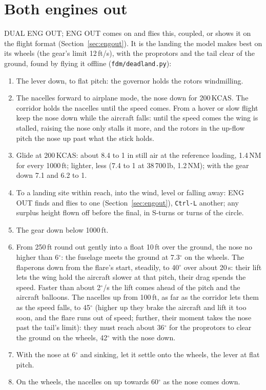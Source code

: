 \documentclass[11pt,a4paper,oneside]{book}
\newcommand{\key}[1]{\texttt{#1}}
\newcommand{\ann}[1]{\textsf{#1}}
\begin{document}
\section{Both engines out}\label{sec:dualeng}
\ann{DUAL ENG OUT}; ENG OUT comes on and flies this, coupled, or shows it on the flight format
(Section~\ref{sec:engout}). It is the landing the model makes best on its wheels (the gear's limit 12\,ft/s), with the
proprotors and the tail clear of the ground, found by flying it offline (\texttt{fdm/deadland.py}):
\begin{enumerate}
\item The lever down, to flat pitch: the governor holds the rotors windmilling.
\item The nacelles forward to airplane mode, the nose down for 200\,KCAS. The corridor holds the nacelles until the
speed comes. From a hover or slow flight keep the nose down while the aircraft falls: until the speed comes the wing
is stalled, raising the nose only stalls it more, and the rotors in the up-flow pitch the nose up past what the stick
holds.
\item Glide at 200\,KCAS: about 8.4 to 1 in still air at the reference loading, 1.4\,NM for every 1000\,ft; lighter,
less (7.4 to 1 at 38\,700\,lb, 1.2\,NM); with the gear down 7.1 and 6.2 to 1.
\item To a landing site within reach, into the wind, level or falling away: ENG OUT finds and flies to one
(Section~\ref{sec:engout}), \key{Ctrl-L} another; any surplus height flown off before the final, in S-turns or turns
of the circle.
\item The gear down below 1000\,ft.
\item From 250\,ft round out gently into a float 10\,ft over the ground, the nose no higher than 6$^\circ$: the
fuselage meets the ground at 7.3$^\circ$ on the wheels. The flaperons down from the flare's start, steadily, to
40$^\circ$ over about 20\,s: their lift lets the wing hold the aircraft slower at that pitch, their drag spends the
speed. Faster than about 2$^\circ$/s the lift comes ahead of the pitch and the aircraft balloons. The nacelles up from
100\,ft, as far as the corridor lets them as the speed falls, to 45$^\circ$ (higher up they brake the aircraft and lift
it too soon, and the flare runs out of speed; further, their moment takes the nose past the tail's limit): they must
reach about 36$^\circ$ for the proprotors to clear the ground on the wheels, 42$^\circ$ with the nose down.
\item With the nose at 6$^\circ$ and sinking, let it settle onto the wheels, the lever at flat pitch.
\item On the wheels, the nacelles on up towards 60$^\circ$ as the nose comes down.
\end{enumerate}
\end{document}
